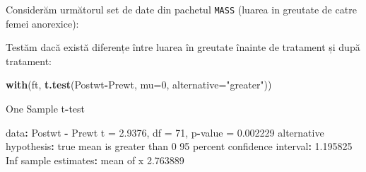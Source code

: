\documentclass[]{article}
\newenvironment{Shaded}{\begin{snugshade}}{\end{snugshade}}
\newcommand{\KeywordTok}[1]{\textcolor[rgb]{0.13,0.29,0.53}{\textbf{#1}}}
\newcommand{\DataTypeTok}[1]{\textcolor[rgb]{0.13,0.29,0.53}{#1}}
\newcommand{\DecValTok}[1]{\textcolor[rgb]{0.00,0.00,0.81}{#1}}
\newcommand{\FloatTok}[1]{\textcolor[rgb]{0.00,0.00,0.81}{#1}}
\newcommand{\StringTok}[1]{\textcolor[rgb]{0.31,0.60,0.02}{#1}}
\newcommand{\CommentTok}[1]{\textcolor[rgb]{0.56,0.35,0.01}{\textit{#1}}}
\newcommand{\OtherTok}[1]{\textcolor[rgb]{0.56,0.35,0.01}{#1}}
\newcommand{\OperatorTok}[1]{\textcolor[rgb]{0.81,0.36,0.00}{\textbf{#1}}}
\newcommand{\ErrorTok}[1]{\textcolor[rgb]{0.64,0.00,0.00}{\textbf{#1}}}
\newcommand{\NormalTok}[1]{#1}
\begin{document}
Considerăm următorul set de date din pachetul \texttt{MASS} (luarea in
greutate de catre femei anorexice):

\begin{Shaded}
\end{Shaded}

Testăm dacă există diferențe între luarea în greutate înainte de
tratament și după tratament:

\begin{Shaded}
\begin{Highlighting}[]
\KeywordTok{with}\NormalTok{(ft, }\KeywordTok{t.test}\NormalTok{(Postwt}\OperatorTok{-}\NormalTok{Prewt, }\DataTypeTok{mu=}\DecValTok{0}\NormalTok{, }\DataTypeTok{alternative=}\StringTok{"greater"}\NormalTok{))}

\NormalTok{    One Sample t}\OperatorTok{-}\NormalTok{test}

\NormalTok{data}\OperatorTok{:}\StringTok{  }\NormalTok{Postwt }\OperatorTok{-}\StringTok{ }\NormalTok{Prewt}
\NormalTok{t =}\StringTok{ }\FloatTok{2.9376}\NormalTok{, df =}\StringTok{ }\DecValTok{71}\NormalTok{, p}\OperatorTok{-}\NormalTok{value =}\StringTok{ }\FloatTok{0.002229}
\NormalTok{alternative hypothesis}\OperatorTok{:}\StringTok{ }\NormalTok{true mean is greater than }\DecValTok{0}
\DecValTok{95}\NormalTok{ percent confidence interval}\OperatorTok{:}
\StringTok{ }\FloatTok{1.195825}      \OtherTok{Inf}
\NormalTok{sample estimates}\OperatorTok{:}
\NormalTok{mean of x }
 \FloatTok{2.763889} 
\end{Highlighting}
\end{Shaded}
\end{document}
